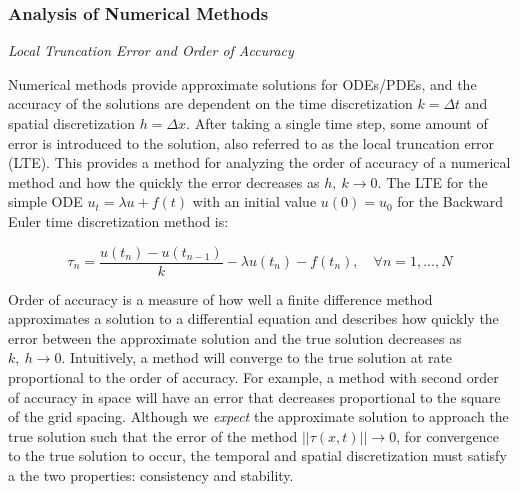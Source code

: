 
\subsubsection{Analysis of Numerical Methods}
\vspace{0.25cm}
\noindent\textit{Local Truncation Error and Order of Accuracy}
\vspace{0.25cm}

Numerical methods provide approximate solutions for ODEs/PDEs, and the accuracy of the solutions are dependent on the time discretization $k = \Delta t$ and spatial discretization $h = \Delta x$. After taking a single time step, some amount of error is introduced to the solution, also referred to as the local truncation error (LTE). This provides a method for analyzing the order of accuracy of a numerical method and how the quickly the error decreases as $h, \ k \rightarrow 0$. The LTE for the simple ODE $u_t = \lambda u + f(t)$ with an initial value $u(0) = u_0$ for the Backward Euler time discretization method is: 

\begin{equation}\label{eq:trunc_err}
    \tau_n = \frac{u(t_n) - u(t_{n-1})}{k} - \lambda u(t_n) - f(t_n), \quad \forall n = 1, ..., N
\end{equation}

 Order of accuracy is a measure of how well a finite difference method approximates a solution to a differential equation and describes how quickly the error between the approximate solution and the true solution decreases as $k, \ h \rightarrow 0$. Intuitively, a method will converge to the true solution at rate proportional to the order of accuracy. For example, a method with second order of accuracy in space will have an error that decreases proportional to the square of the grid spacing. Although we \textit{expect} the approximate solution to approach the true solution such that the error of the method $||\tau(x,t)|| \rightarrow 0$, for convergence to the true solution to occur, the temporal and spatial discretization must satisfy a the two properties: consistency and stability. 

